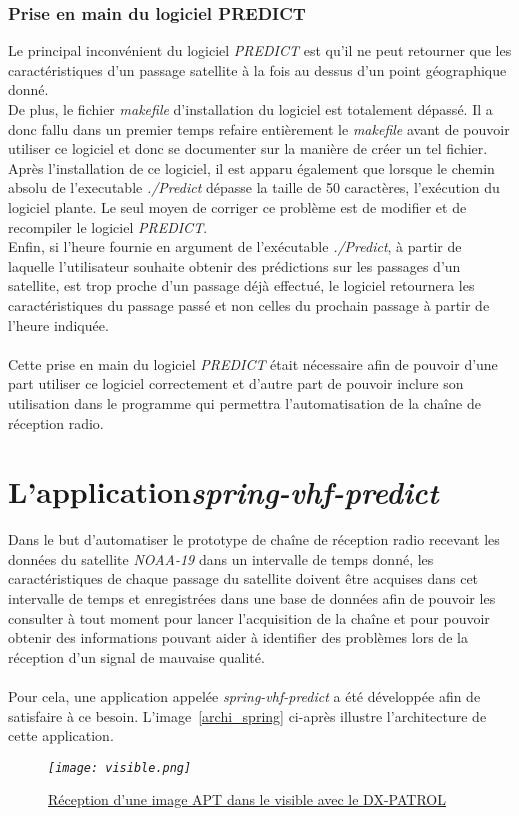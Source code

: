 \documentclass[12pt,fleqn]{book} %
\begin{document}
\subsubsection{Prise en main du logiciel PREDICT}
Le principal inconvénient du logiciel \emph{PREDICT} est qu'il ne peut retourner que les caractéristiques d'un passage satellite à la fois au dessus d'un point géographique donné.  
~\\De plus, le fichier \emph{makefile} d'installation du logiciel est totalement dépassé. Il a donc fallu dans un premier temps refaire entièrement le \emph{makefile} avant de pouvoir utiliser ce logiciel et donc se documenter sur la manière de créer un tel fichier. 
~\\Après l'installation de ce logiciel, il est apparu également que lorsque le chemin absolu de l'executable \emph{./Predict} dépasse la taille de 50 caractères, l'exécution du logiciel plante. Le seul moyen de corriger ce problème est de modifier et de recompiler le logiciel \emph{PREDICT}.
~\\Enfin, si l'heure fournie en argument de l'exécutable \emph{./Predict}, à partir de laquelle l'utilisateur souhaite obtenir des prédictions sur les passages d'un satellite, est trop proche d'un passage déjà effectué, le logiciel retournera les caractéristiques du passage passé et non celles du prochain passage à partir de l'heure indiquée.
~\\\\Cette prise en main du logiciel \emph{PREDICT} était nécessaire afin de pouvoir d'une part utiliser ce logiciel correctement et d'autre part de pouvoir inclure son utilisation dans le programme qui permettra l'automatisation de la chaîne de réception radio.
\section{L'application\emph{spring-vhf-predict}}
Dans le but d'automatiser le prototype de chaîne de réception radio recevant les données du satellite \emph{NOAA-19} dans un intervalle de temps donné, les caractéristiques de chaque passage du satellite doivent être acquises dans cet intervalle de temps et enregistrées dans une base de données afin de pouvoir les consulter à tout moment pour lancer l'acquisition de la chaîne et pour pouvoir obtenir des informations pouvant aider à identifier des problèmes lors de la réception d'un signal de mauvaise qualité.
~\\\\Pour cela, une application appelée \emph{spring-vhf-predict} a été développée afin de satisfaire à ce besoin. L'image~\ref{archi_spring} ci-après illustre l'architecture de cette application.
\begin{figure}[H]
	\centering
	\itshape
	\texttt{[image: visible.png]}
	\caption{\label{visible} \underline{Réception d'une image APT dans le visible avec le DX-PATROL}}
\end{figure}
\end{document}
